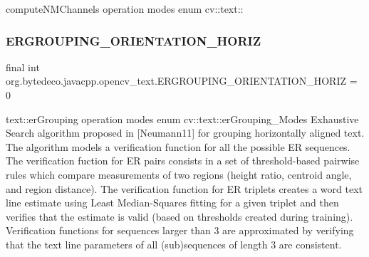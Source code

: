 compute\+N\+M\+Channels operation modes enum cv\+::text\+:\+: \mbox{\label{group__text__detect_gab646588b9db6ae1e1aae89cc09ea4059}} 
\subsubsection{\texorpdfstring{E\+R\+G\+R\+O\+U\+P\+I\+N\+G\+\_\+\+O\+R\+I\+E\+N\+T\+A\+T\+I\+O\+N\+\_\+\+H\+O\+R\+IZ}{ERGROUPING\_ORIENTATION\_HORIZ}}
{\footnotesize\ttfamily final int org.\+bytedeco.\+javacpp.\+opencv\+\_\+text.\+E\+R\+G\+R\+O\+U\+P\+I\+N\+G\+\_\+\+O\+R\+I\+E\+N\+T\+A\+T\+I\+O\+N\+\_\+\+H\+O\+R\+IZ = 0\hspace{0.3cm}{\ttfamily [static]}}

text\+::er\+Grouping operation modes enum cv\+::text\+::er\+Grouping\+\_\+\+Modes Exhaustive Search algorithm proposed in \mbox{[}Neumann11\mbox{]} for grouping horizontally aligned text. The algorithm models a verification function for all the possible ER sequences. The verification fuction for ER pairs consists in a set of threshold-\/based pairwise rules which compare measurements of two regions (height ratio, centroid angle, and region distance). The verification function for ER triplets creates a word text line estimate using Least Median-\/\+Squares fitting for a given triplet and then verifies that the estimate is valid (based on thresholds created during training). Verification functions for sequences larger than 3 are approximated by verifying that the text line parameters of all (sub)sequences of length 3 are consistent. 